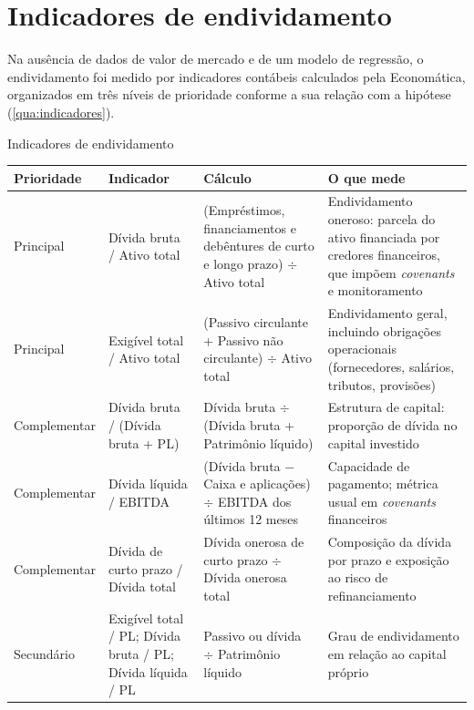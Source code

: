 \section{Indicadores de endividamento}\label{sec:indicadores}

Na ausência de dados de valor de mercado e de um modelo de regressão, o
endividamento foi medido por indicadores contábeis calculados pela Economática,
organizados em três níveis de prioridade conforme a sua relação com a hipótese
(\autoref{qua:indicadores}).

\begin{quadro}[htb]
\caption{Indicadores de endividamento}\label{qua:indicadores}
\centering\small
\begin{tabularx}{\textwidth}{|P{2.5cm}|P{2.9cm}|L|L|}
\hline
\textbf{Prioridade} & \textbf{Indicador} & \textbf{Cálculo} & \textbf{O que mede} \\ \hline
Principal & Dívida bruta / Ativo total & (Empréstimos, financiamentos e debêntures de curto e longo prazo) $\div$ Ativo total & Endividamento oneroso: parcela do ativo financiada por credores financeiros, que impõem \textit{covenants} e monitoramento \\ \hline
Principal & Exigível total / Ativo total & (Passivo circulante + Passivo não circulante) $\div$ Ativo total & Endividamento geral, incluindo obrigações operacionais (fornecedores, salários, tributos, provisões) \\ \hline
Complementar & Dívida bruta / (Dívida bruta + PL) & Dívida bruta $\div$ (Dívida bruta + Patrimônio líquido) & Estrutura de capital: proporção de dívida no capital investido \\ \hline
Complementar & Dívida líquida / EBITDA & (Dívida bruta $-$ Caixa e aplicações) $\div$ EBITDA dos últimos 12 meses & Capacidade de pagamento; métrica usual em \textit{covenants} financeiros \\ \hline
Complementar & Dívida de curto prazo / Dívida total & Dívida onerosa de curto prazo $\div$ Dívida onerosa total & Composição da dívida por prazo e exposição ao risco de refinanciamento \\ \hline
Secundário & Exigível total / PL; Dívida bruta / PL; Dívida líquida / PL & Passivo ou dívida $\div$ Patrimônio líquido & Grau de endividamento em relação ao capital próprio \\ \hline
\end{tabularx}
\end{quadro}

